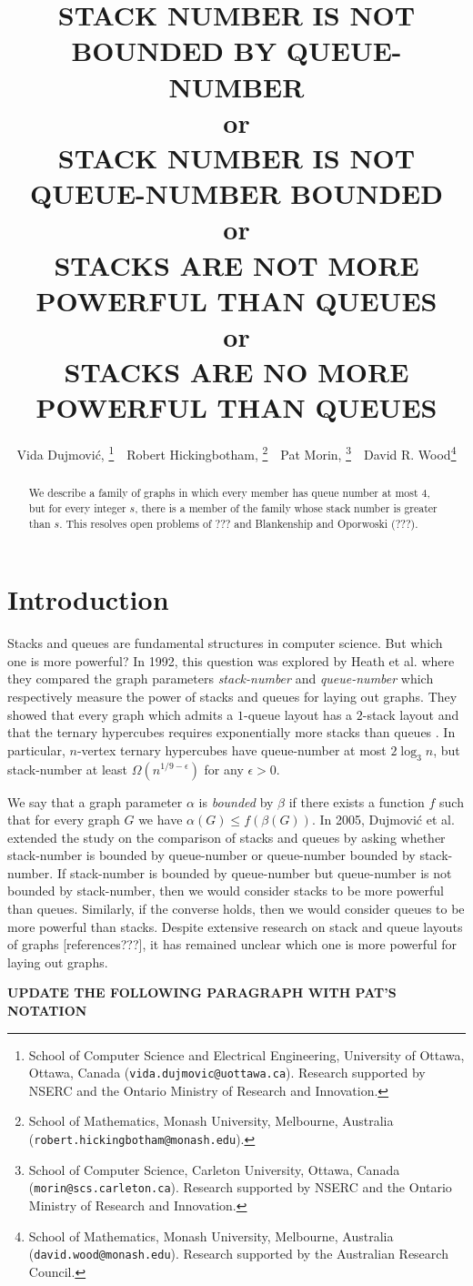 \documentclass[kpfonts]{patmorin}
\title{
\MakeUppercase{Stack Number is not Bounded by Queue-Number}
\\or\\
\MakeUppercase{Stack Number is not Queue-Number Bounded}
\\or\\
STACKS ARE NOT MORE POWERFUL THAN QUEUES
\\or\\
STACKS ARE NO MORE POWERFUL THAN QUEUES}
\author{Vida Dujmovi\'c,\!\!%
	\thanks{School of Computer Science and Electrical Engineering,
		University of Ottawa, Ottawa, Canada (\texttt{vida.dujmovic@uottawa.ca}).
		Research supported by NSERC and the Ontario Ministry of Research and Innovation.}
	\,\,
	Robert Hickingbotham,\!\!%
	\thanks{School of Mathematics, Monash University, Melbourne, Australia (\texttt{robert.hickingbotham@monash.edu}).}
	\,\,
	Pat Morin,\!\!%
	\thanks{School of Computer Science, Carleton University, Ottawa, Canada (\texttt{morin@scs.carleton.ca}). Research  supported by NSERC and the Ontario Ministry of Research and Innovation.}
	\,\,
	David R. Wood\thanks{School of Mathematics, Monash University, Melbourne, Australia (\texttt{david.wood@monash.edu}). Research supported by the Australian Research Council.}
}
\renewcommand{\leq}{\leqslant}
\begin{document}
\maketitle

\begin{abstract}
  We describe a family of graphs in which every member has queue number at most 4, but for every integer $s$, there is a member of the family whose stack number is greater than $s$. This resolves open problems of ??? and Blankenship and Oporwoski (???).
\end{abstract}

\section{Introduction}

Stacks and queues are fundamental structures in computer science. But which one is more powerful? In 1992, this question was explored by Heath et al. \cite{HLR92} where they compared the graph parameters \textit{stack-number} and \textit{queue-number} which respectively measure the power of stacks and queues for laying out graphs. They showed that every graph which admits a $1$-queue layout has a $2$-stack layout and that the ternary hypercubes requires exponentially more stacks than queues \cite{HLR92}. In particular, $n$-vertex ternary hypercubes have queue-number at most $2 \log_3 n$, but stack-number at least $\Omega(n^{1/9-\epsilon})$ for any $\epsilon>0$.

We say that a graph parameter $\alpha$ is \textit{bounded} by $\beta$ if there exists a function $f$ such that for every graph $G$ we have $\alpha(G) \leq f(\beta(G))$. In 2005, Dujmovi\'c et al. \cite{DujWoo05} extended the study on the comparison of stacks and queues by asking whether stack-number is bounded by queue-number or queue-number bounded by stack-number. If stack-number is bounded by queue-number but queue-number is not bounded by stack-number, then we would consider stacks to be more powerful than queues. Similarly, if the converse holds, then we would consider queues to be more powerful than stacks. Despite extensive research on stack and queue layouts of graphs [references???], it has remained unclear which one is more powerful for laying out graphs.

\textbf{UPDATE THE FOLLOWING PARAGRAPH WITH PAT'S NOTATION}
\end{document}
